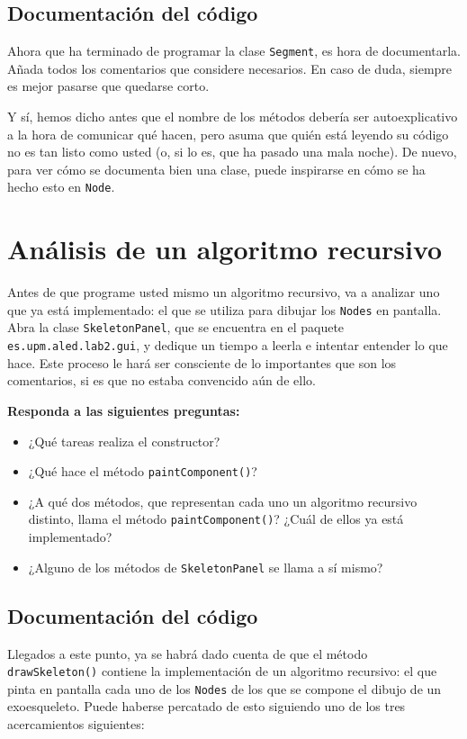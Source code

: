 \documentclass[10pt,a4paper,spanish]{article}
\newcommand{\code}[1]{\texttt{#1}}
\begin{document}
\subsection{Documentación del código}

Ahora que ha terminado de programar la clase \code{Segment}, es hora de documentarla. Añada todos los comentarios que considere necesarios. En caso de duda, siempre es mejor pasarse que quedarse corto.

Y sí, hemos dicho antes que el nombre de los métodos debería ser autoexplicativo a la hora de comunicar qué hacen, pero asuma que quién está leyendo su código no es tan listo como usted (o, si lo es, que ha pasado una mala noche). De nuevo, para ver cómo se documenta bien una clase, puede inspirarse en cómo se ha hecho esto en \code{Node}.

\section{Análisis de un algoritmo recursivo}

Antes de que programe usted mismo un algoritmo recursivo, va a analizar uno que ya está implementado: el que se utiliza para dibujar los \code{Nodes} en pantalla. Abra la clase \code{SkeletonPanel}, que se encuentra en el paquete \code{es.upm.aled.lab2.gui}, y dedique un tiempo a leerla e intentar entender lo que hace. Este proceso le hará ser consciente de lo importantes que son los comentarios, si es que no estaba convencido aún de ello.

\textbf{Responda a las siguientes preguntas:}

\begin{itemize}
    \item ¿Qué tareas realiza el constructor?
    \item ¿Qué hace el método \code{paintComponent()}?
    \item ¿A qué dos métodos, que representan cada uno un algoritmo recursivo distinto, llama el método \code{paintComponent()}? ¿Cuál de ellos ya está implementado?
    \item ¿Alguno de los métodos de \code{SkeletonPanel} se llama a sí mismo?
\end{itemize}

\subsection{Documentación del código}

Llegados a este punto, ya se habrá dado cuenta de que el método \code{drawSkeleton()} contiene la implementación de un algoritmo recursivo: el que pinta en pantalla cada uno de los \code{Nodes} de los que se compone el dibujo de un exoesqueleto. Puede haberse percatado de esto siguiendo uno de los tres acercamientos siguientes:
\end{document}
